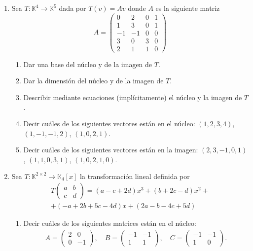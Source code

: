 \documentclass[a4paper,12pt,twoside,spanish,reqno]{amsbook}
\numberwithin{equation}{section}
\begin{document}
\begin{enumerate}[topsep=6pt, itemsep=.4cm]
\item Sea $T: \mathbb{K}^4 \to \mathbb{K}^5$ dada por $T(v) = Av$ donde $A$ es la siguiente matriz
    $$
    A=\left(\begin{matrix}
    0& 2& 0&1\\   1& 3& 0&1\\  -1&-1&0&0\\3&0&3&0\\2&1&1&0 \end{matrix}
    \right)
    $$
    \begin{enumerate}[topsep=5pt,itemsep=5pt]
        \item Dar una base del núcleo y de la imagen de $T$. 
        \item Dar la dimensión del núcleo y de la imagen de $T$.
        \item Describir mediante ecuaciones (implícitamente) el núcleo y la imagen de $T$.
        \item Decir cuáles de los siguientes vectores están en el núcleo:
        $(1,2,3,4)$, $(1,-1,-1,2)$, $(1,0,2,1)$.
        \item Decir cuáles de los siguientes vectores están en la imagen:
        $(2,3,-1,0,1)$, $(1,1,0,3,1)$, $(1,0,2,1,0)$.
    \end{enumerate}
    

    \item Sea $T:\mathbb{K}^{2\times 2}\longrightarrow\mathbb{K}_{4}[x]$ la transformación lineal definida por
\begin{multline*}
T\left(\begin{array}{cc}
 a&b\\c&d
  \end{array}
\right)=
(a-c+2d)x^3+(b+2c-d)x^2+ \\
+(-a+2b+5c-4d)x+(2a-b-4c+5d)
\end{multline*}
\begin{enumerate}
 \item Decir cuáles de los siguientes matrices están en el núcleo:
 \begin{align*}
 A=\left(\begin{array}{rr}
    2&0\\0&-1
   \end{array}
   \right),
   \quad
   B=\left(\begin{array}{rr}
    -1&-1\\1&1
   \end{array}
   \right),
   \quad
   C=\left(\begin{array}{rr}
    -1&-1\\1&0
   \end{array}
   \right).
 \end{align*}


\end{enumerate}
\end{enumerate}
\end{document}
